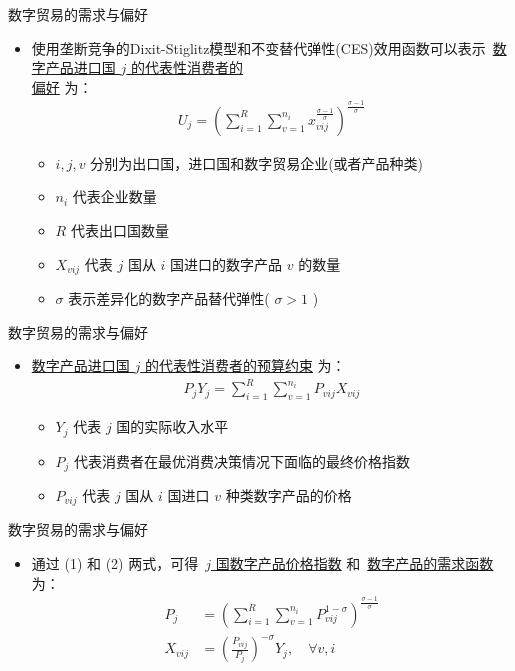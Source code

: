 \documentclass{beamer}
\begin{document}
\begin{frame}{数字贸易的需求与偏好}
    \begin{itemize}
        \item 使用垄断竞争的Dixit-Stiglitz模型和不变替代弹性(CES)效用函数可以表示\ \uline{数字产品进口国 $j$ 的代表性消费者的 \\ 偏好} 为：
        \begin{gather*}
            U_j = (\sum_{i=1}^{R} \sum_{v=1}^{n_i} x_{vij}^{\frac{\sigma - 1} {\sigma}})^{\frac{\sigma -1}{\sigma}} \tag{1}
        \end{gather*}
        \begin{itemize}
            \item $i, j, v$ 分别为出口国，进口国和数字贸易企业(或者产品种类)
            \item $n_i$ 代表企业数量
            \item $R$ 代表出口国数量
            \item $X_{vij}$ 代表 $j$ 国从 $i$ 国进口的数字产品 $v$ 的数量
            \item $\sigma$ 表示差异化的数字产品替代弹性( $\sigma > 1$ )
        \end{itemize}
    \end{itemize}
\end{frame}

\begin{frame}{数字贸易的需求与偏好}
    \begin{itemize}
        \item \underline{数字产品进口国 $j$ 的代表性消费者的预算约束} 为：
        \begin{gather*}
            P_jY_j = \sum_{i=1}^{R} \sum_{v=1}^{n_i} P_{vij}X_{vij} \tag{2}
        \end{gather*}
        \begin{itemize}
            \item $Y_j$ 代表 $j$ 国的实际收入水平
            \item $P_j$ 代表消费者在最优消费决策情况下面临的最终价格指数
            \item $P_{vij}$ 代表 $j$ 国从 $i$ 国进口 $v$ 种类数字产品的价格
        \end{itemize}
    \end{itemize}
\end{frame}

\begin{frame}{数字贸易的需求与偏好}
    \begin{itemize}
        \item 通过 (1) 和 (2) 两式，可得\ \underline{$j$ 国数字产品价格指数} 和\ \underline{数字产品的需求函数} 为：
        \begin{align*}
            P_j &= (\sum_{i=1}^{R} \sum_{v=1}^{n_i} P_{vij}^{1 - \sigma})^{\frac{\sigma - 1}{\sigma}} \tag{3} \\
            X_{vij} &= (\frac{P_{vij}}{P_j})^{-\sigma}Y_j,\quad \forall v, i \tag{4}
        \end{align*}
    \end{itemize}
\end{frame}
\end{document}
